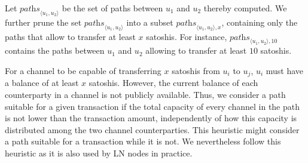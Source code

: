 
Let $\textit{paths}_{\langle u_1, u_2 \rangle}$ be the set of paths between $u_1$ and $u_2$ thereby computed. 
We further prune the set $\textit{paths}_{\langle u_1, u_2 \rangle}$ into a subset 
$\textit{paths}_{\langle u_1, u_2 \rangle, x}$, containing  only the paths that 
allow to transfer at least $x$ satoshis. 
For instance, $\textit{paths}_{\langle u_1, u_2 \rangle, 10}$ 
contains the paths between $u_1$ and $u_2$ allowing to transfer at least $10$ satoshis. 


For a channel to be capable of transferring $x$ satoshis from $u_i$ to $u_j$, $u_i$ must have a balance of 
at least $x$ satoshis. However, the current balance of each counterparty in a channel is not publicly available. 
Thus, we consider a path suitable for a given transaction if the total capacity of every channel 
in the path is not lower than the transaction amount, independently of how this capacity 
is distributed among the two channel counterparties. 
This heuristic might consider a path suitable for a transaction while it is not.
We nevertheless follow this heuristic as it is also used by LN nodes in practice. 


